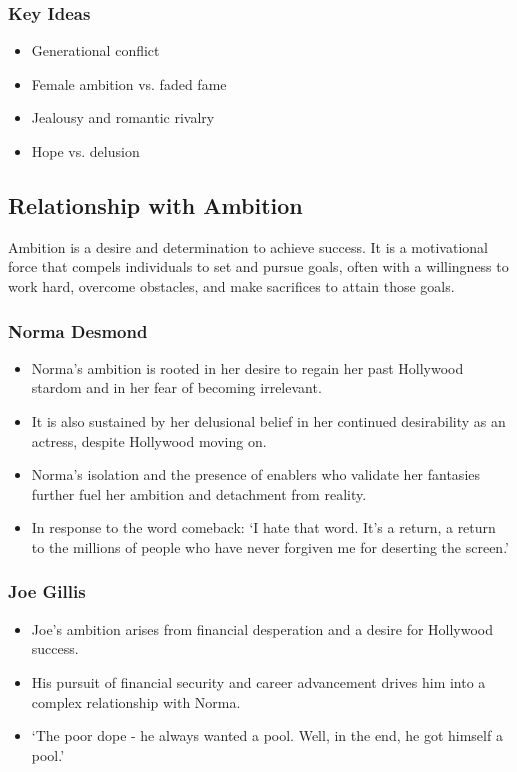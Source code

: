 \documentclass[a4paper]{article}
\begin{document}
\subsubsection*{Key Ideas}
\begin{itemize}
    \item Generational conflict
    \item Female ambition vs. faded fame
    \item Jealousy and romantic rivalry
    \item Hope vs. delusion
\end{itemize}

\subsection*{Relationship with Ambition}
Ambition is a desire and determination to achieve success. It is a motivational force that compels individuals to set and pursue goals, often with a willingness to work hard, overcome obstacles, and make sacrifices to attain those goals.\\

\subsubsection{Norma Desmond}
\begin{itemize}
\item Norma’s ambition is rooted in her desire to regain her past Hollywood stardom and in her fear of becoming irrelevant.
\item It is also sustained by her delusional belief in her continued desirability as an actress, despite Hollywood moving on. 
\item Norma’s isolation and the presence of enablers who validate her fantasies further fuel her ambition and detachment from reality.
\item In response to the word comeback: ‘I hate that word. It’s a return, a return to the millions of people who have never forgiven me for deserting the screen.’
\end{itemize}

\subsubsection{Joe Gillis}
\begin{itemize}
\item Joe’s ambition arises from financial desperation and a desire for Hollywood success.
\item His pursuit of financial security and career advancement drives him into a complex relationship with Norma.
\item ‘The poor dope - he always wanted a pool. Well, in the end, he got himself a pool.’
\end{itemize}
\end{document}
